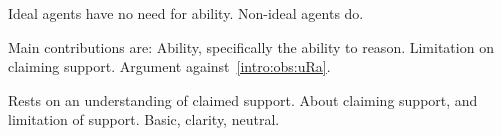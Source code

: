 \begin{note}
  Ideal agents have no need for ability.
  Non-ideal agents do.
\end{note}

\begin{note}
  Main contributions are:
  Ability, specifically the ability to reason.
  Limitation on claiming support.
  Argument against~\ref{intro:obs:uRa}.
\end{note}

\begin{note}
  Rests on an understanding of claimed support.
  About claiming support, and limitation of support.
  Basic, clarity, neutral.
\end{note}

